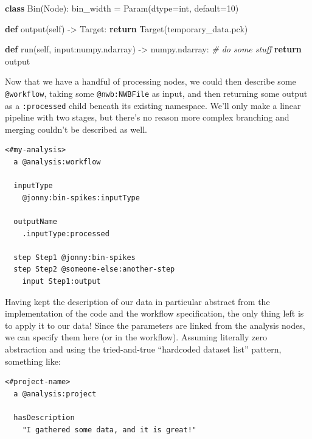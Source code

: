 \documentclass[10pt]{article}
\newenvironment{Shaded}{}{}
\newcommand{\BuiltInTok}[1]{#1}
\newcommand{\CommentTok}[1]{\textcolor[rgb]{0.38,0.63,0.69}{\textit{#1}}}
\newcommand{\ControlFlowTok}[1]{\textcolor[rgb]{0.00,0.44,0.13}{\textbf{#1}}}
\newcommand{\DecValTok}[1]{\textcolor[rgb]{0.25,0.63,0.44}{#1}}
\newcommand{\KeywordTok}[1]{\textcolor[rgb]{0.00,0.44,0.13}{\textbf{#1}}}
\newcommand{\NormalTok}[1]{#1}
\newcommand{\OperatorTok}[1]{\textcolor[rgb]{0.40,0.40,0.40}{#1}}
\newcommand{\StringTok}[1]{\textcolor[rgb]{0.25,0.44,0.63}{#1}}
\newcommand{\VariableTok}[1]{\textcolor[rgb]{0.10,0.09,0.49}{#1}}
\begin{document}
\begin{multicols}{2}
\begin{Shaded}
\begin{Highlighting}[]
\KeywordTok{class}\NormalTok{ Bin(Node):}
\NormalTok{  bin\_width }\OperatorTok{=}\NormalTok{ Param(dtype}\OperatorTok{=}\BuiltInTok{int}\NormalTok{, default}\OperatorTok{=}\DecValTok{10}\NormalTok{)}

  \KeywordTok{def}\NormalTok{ output(}\VariableTok{self}\NormalTok{) }\OperatorTok{{-}\textgreater{}}\NormalTok{ Target:}
    \ControlFlowTok{return}\NormalTok{ Target(}\StringTok{\textquotesingle{}temporary\_data.pck\textquotesingle{}}\NormalTok{)}

  \KeywordTok{def}\NormalTok{ run(}\VariableTok{self}\NormalTok{, }\BuiltInTok{input}\NormalTok{:}\StringTok{\textquotesingle{}numpy.ndarray\textquotesingle{}}\NormalTok{) }\OperatorTok{{-}\textgreater{}} \StringTok{\textquotesingle{}numpy.ndarray\textquotesingle{}}\NormalTok{:}
    \CommentTok{\# do some stuff}
    \ControlFlowTok{return}\NormalTok{ output}
\end{Highlighting}
\end{Shaded}

Now that we have a handful of processing nodes, we could then describe
some \texttt{@workflow}, taking some \texttt{@nwb:NWBFile} as input, and
then returning some output as a \texttt{:processed} child beneath its
existing namespace. We'll only make a linear pipeline with two stages,
but there's no reason more complex branching and merging couldn't be
described as well.

\begin{verbatim}
<#my-analysis>
  a @analysis:workflow

  inputType 
    @jonny:bin-spikes:inputType

  outputName
    .inputType:processed

  step Step1 @jonny:bin-spikes
  step Step2 @someone-else:another-step
    input Step1:output
\end{verbatim}

Having kept the description of our data in particular abstract from the
implementation of the code and the workflow specification, the only
thing left is to apply it to our data! Since the parameters are linked
from the analysis nodes, we can specify them here (or in the workflow).
Assuming literally zero abstraction and using the tried-and-true
``hardcoded dataset list'' pattern, something like:

\begin{verbatim}
<#project-name>
  a @analysis:project

  hasDescription
    "I gathered some data, and it is great!"


\end{verbatim}
\end{multicols}
\end{document}
